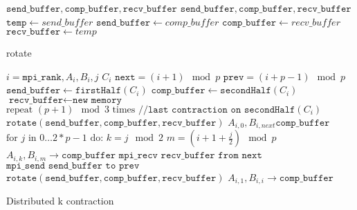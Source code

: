 \begin{algorithm}[ht]
    \begin{algorithmic}
        \Require $\texttt{send\_buffer},\texttt{comp\_buffer},\texttt{recv\_buffer}$
        \Ensure $\texttt{send\_buffer},\texttt{comp\_buffer},\texttt{recv\_buffer}$
        \State $\texttt{temp} \gets {send\_buffer}$
        \State $\texttt{send\_buffer} \gets {comp\_buffer}$
        \State $\texttt{comp\_buffer} \gets {recv\_buffer}$
        \State $\texttt{recv\_buffer} \gets {temp}$
    \end{algorithmic}
    \caption{rotate}
    \label{rotate_pseudocode}
\end{algorithm}

\begin{algorithm}[ht]
    \begin{algorithmic}
    \Require $i = \texttt{mpi\_rank}, A_i, B_i, j$
    \Ensure $C_i$
    \State $\texttt{next} = (i+1) \mod p$
    \State $\texttt{prev} = (i+p-1) \mod p$
    \State $\texttt{send\_buffer} \gets \texttt{firstHalf}(C_i)$
    \State $\texttt{comp\_buffer} \gets \texttt{secondHalf}(C_i)$
    \State $\texttt{recv\_buffer} \gets \texttt{new memory}$
    \State $\text{repeat } (p+1) \mod 3 \text{ times} \texttt{ //last contraction on secondHalf}(C_i)$ 
    \State \indent $\texttt{rotate}(\texttt{send\_buffer},\texttt{comp\_buffer},\texttt{recv\_buffer})$
    \State $A_{i,0}, B_{i,next} \texttt{comp\_buffer}$
    \State  $\text{for } j \text{ in } 0\dots 2 * p - 1 \text{ do:}$
    \State \indent $ k = j \mod 2 $
    \State \indent $ m = (i + 1 + \frac{j}{2}) \mod p$
    \State \indent {}
    \State \indent \indent $A_{i,k}, B_{i,m} \rightarrow \texttt{comp\_buffer}$
    \State \indent \indent $\texttt{mpi\_recv recv\_buffer from next}$
    \State \indent \indent $\texttt{mpi\_send send\_buffer to prev}$
    \State \indent $\texttt{rotate}(\texttt{send\_buffer},\texttt{comp\_buffer},\texttt{recv\_buffer})$
    \State $A_{i,1}, B_{i,i} \rightarrow \texttt{comp\_buffer}$

\end{algorithmic}
\caption{Distributed k contraction}
\label{alg:k_pseudocode}
\end{algorithm}

